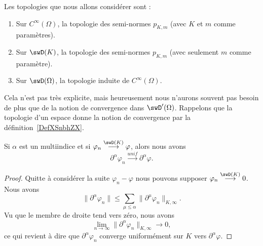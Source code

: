 \begin{definition}  \label{DefFGGCooTYgmYf}
Les topologies que nous allons considérer sont :
\begin{enumerate}
    \item
        Sur \(  C^{\infty}(\Omega)\), la topologie des semi-normes \( p_{K,m}\) (avec \( K\) et \( m\) comme paramètres).
    \item
        Sur \( \swD(K)\), la topologie des semi-normes \( p_{K,m}\) (avec seulement \( m\) comme paramètre).
    \item
        Sur \( \swD(\Omega)\), la topologie induite de \(  C^{\infty}(\Omega)\).
\end{enumerate}
\end{definition}
Cela n'est pas très explicite, mais heureusement nous n'aurons souvent pas besoin de plus que de la notion de convergence dans \( \swD'(\Omega)\). Rappelons que la topologie d'un espace donne la notion de convergence par la définition~\ref{DefXSnbhZX}.

\begin{lemma}    \label{LemXXwDjui}
    Si \( \alpha\) est un multiindice et si \( \varphi_n\stackrel{\swD(K)}{\longrightarrow}\varphi\), alors nous avons
    \begin{equation}
        \partial^{\alpha}\varphi_n\stackrel{unif}{\longrightarrow}\partial^{\alpha}\varphi.
    \end{equation}
\end{lemma}

\begin{proof}
    Quitte à considérer la suite \( \varphi_n-\varphi\) nous pouvons supposer \( \varphi_n\stackrel{\swD(K)}{\longrightarrow}0\). Nous avons
    \begin{equation}
        \| \partial^{\alpha}\varphi_n \|\leq \sum_{\mu\leq\alpha}\| \partial^{\mu}\varphi_n \|_{K,\infty}.
    \end{equation}
    Vu que le membre de droite tend vers zéro, nous avons
    \begin{equation}
        \lim_{n\to \infty} \| \partial^{\alpha}\varphi_n \|_{K,\infty}\to 0,
    \end{equation}
    ce qui revient à dire que \( \partial^{\alpha}\varphi_n\) converge uniformément sur \( K\) vers \( \partial^{\alpha}\varphi\).
\end{proof}


